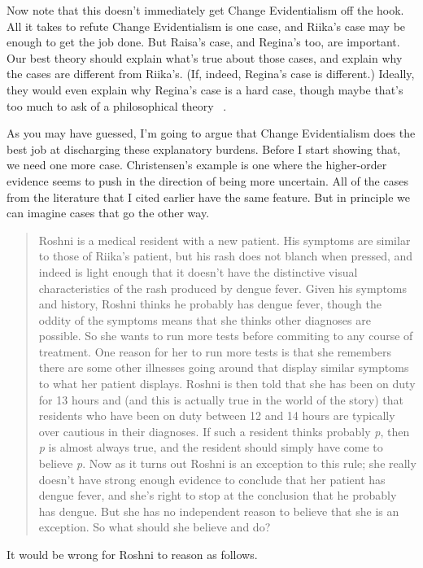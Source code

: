 Now note that this doesn't immediately get Change Evidentialism off the hook. All it takes to refute Change Evidentialism is one case, and \gls{Riika}'s case may be enough to get the job done. But \gls{Raisa}'s case, and \gls{Regina}'s too, are important. Our best theory should explain what's true about those cases, and explain why the cases are different from \gls{Riika}'s. (If, indeed, Regina's case is different.) Ideally, they would even explain why \gls{Regina}'s case is a hard case, though maybe that's too much to ask of a philosophical theory ~\citep{Ichikawa2009}.

As you may have guessed, I'm going to argue that Change Evidentialism does the best job at discharging these explanatory burdens. Before I start showing that, we need one more case. Christensen's example is one where the higher-order evidence seems to push in the direction of being more uncertain. All of the cases from the literature that I cited earlier have the same feature. But in principle we can imagine cases that go the other way.

\begin{quote}
\gls{Roshni} is a medical resident with a new patient. His symptoms are similar to those of \gls{Riika}'s patient, but his rash does not blanch when pressed, and indeed is light enough that it doesn't have the distinctive visual characteristics of the rash produced by dengue fever. Given his symptoms and history, \gls{Roshni} thinks he probably has dengue fever, though the oddity of the symptoms means that she thinks other diagnoses are possible. So she wants to run more tests before commiting to any course of treatment. One reason for her to run more tests is that she remembers there are some other illnesses going around that display similar symptoms to what her patient displays. \gls{Roshni} is then told that she has been on duty for 13 hours and (and this is actually true in the world of the story) that residents who have been on duty between 12 and 14 hours are typically over cautious in their diagnoses. If such a resident thinks probably \emph{p}, then \emph{p} is almost always true, and the resident should simply have come to believe \emph{p}. Now as it turns out \gls{Roshni} is an exception to this rule; she really doesn't have strong enough evidence to conclude that her patient has dengue fever, and she's right to stop at the conclusion that he probably has dengue. But she has no independent reason to believe that she is an exception. So what should she believe and do?
\end{quote}
It would be wrong for \gls{Roshni} to reason as follows.

